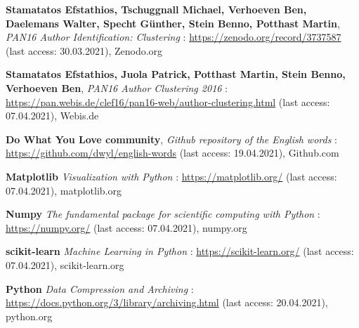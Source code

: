 \begin{thebibliography}{9}
\textbf{Stamatatos Efstathios, Tschuggnall Michael, Verhoeven Ben, Daelemans Walter, Specht Günther, Stein Benno, Potthast Martin},
\textit{PAN16 Author Identification: Clustering} : \url{https://zenodo.org/record/3737587} (last access: 30.03.2021),
Zenodo.org

\textbf{Stamatatos Efstathios, Juola Patrick, Potthast Martin, Stein Benno, Verhoeven Ben},
\textit{PAN16 Author Clustering 2016} : \url{https://pan.webis.de/clef16/pan16-web/author-clustering.html} (last access: 07.04.2021),
Webis.de

\textbf{Do What You Love community},
\textit{Github repository of the English words} : \url{https://github.com/dwyl/english-words} (last access: 19.04.2021),
Github.com



\textbf{Matplotlib}
\textit{Visualization with Python} : \url{https://matplotlib.org/} (last access: 07.04.2021),
matplotlib.org

\textbf{Numpy}
\textit{The fundamental package for scientific computing with Python} : \url{https://numpy.org/} (last access: 07.04.2021),
numpy.org

\textbf{scikit-learn}
\textit{Machine Learning in Python} : \url{https://scikit-learn.org/} (last access: 07.04.2021),
scikit-learn.org

\textbf{Python}
\textit{Data Compression and Archiving} : \url{https://docs.python.org/3/library/archiving.html} (last access: 20.04.2021),
python.org

\end{thebibliography}
